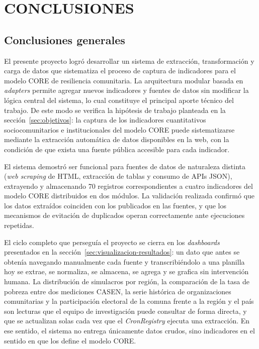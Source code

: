 \documentclass[12pt,letterpaper,oneside]{report}
\begin{document}
\chapter{CONCLUSIONES}
\label{ch:conclusiones}

\section{Conclusiones generales}
\label{sec:conclusiones-generales}

El presente proyecto logr\'o desarrollar un sistema de extracci\'on, transformaci\'on y carga de datos que sistematiza el proceso de captura de indicadores para el modelo CORE de resiliencia comunitaria. La arquitectura modular basada en \textit{adapters} permite agregar nuevos indicadores y fuentes de datos sin modificar la l\'ogica central del sistema, lo cual constituye el principal aporte t\'ecnico del trabajo. De este modo se verifica la hip\'otesis de trabajo planteada en la secci\'on~\ref{sec:objetivos}: la captura de los indicadores cuantitativos sociocomunitarios e institucionales del modelo CORE puede sistematizarse mediante la extracci\'on autom\'atica de datos disponibles en la web, con la condici\'on de que exista una fuente p\'ublica accesible para cada indicador.

El sistema demostr\'o ser funcional para fuentes de datos de naturaleza distinta (\textit{web scraping} de HTML, extracci\'on de tablas y consumo de APIs JSON), extrayendo y almacenando 70 registros correspondientes a cuatro indicadores del modelo CORE distribuidos en dos m\'odulos. La validaci\'on realizada confirm\'o que los datos extra\'idos coinciden con los publicados en las fuentes, y que los mecanismos de evitaci\'on de duplicados operan correctamente ante ejecuciones repetidas.

El ciclo completo que persegu\'ia el proyecto se cierra en los \textit{dashboards} presentados en la secci\'on~\ref{sec:visualizacion-resultados}: un dato que antes se obten\'ia navegando manualmente cada fuente y transcribi\'endolo a una planilla hoy se extrae, se normaliza, se almacena, se agrega y se grafica sin intervenci\'on humana. La distribuci\'on de simulacros por regi\'on, la comparaci\'on de la tasa de pobreza entre dos mediciones CASEN, la serie hist\'orica de organizaciones comunitarias y la participaci\'on electoral de la comuna frente a la regi\'on y el pa\'is son lecturas que el equipo de investigaci\'on puede consultar de forma directa, y que se actualizan solas cada vez que el \textit{CronRegistry} ejecuta una extracci\'on. En ese sentido, el sistema no entrega \'unicamente datos crudos, sino indicadores en el sentido en que los define el modelo CORE.
\end{document}
